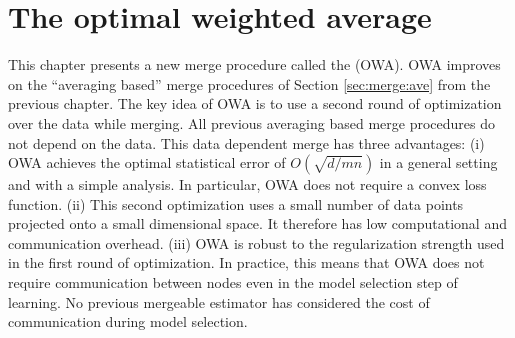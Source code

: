 \documentclass[thesis.tex]{subfiles}
\begin{document}
\chapter{The optimal weighted average}
\label{chapter:owa}

\noindent
This chapter presents a new merge procedure called the  (OWA). 
OWA improves on the ``averaging based'' merge procedures of Section \ref{sec:merge:ave} from the previous chapter.
The key idea of OWA is to use a second round of optimization over the data while merging.
All previous averaging based merge procedures do not depend on the data.
This data dependent merge has three advantages:
(i) OWA achieves the optimal statistical error of $O(\sqrt{d/mn})$ in a general setting and with a simple analysis.
In particular, OWA does not require a convex loss function.
(ii) This second optimization uses a small number of data points projected onto a small dimensional space. 
It therefore has low computational and communication overhead.
(iii) OWA is robust to the regularization strength used in the first round of optimization.
In practice, this means that OWA does not require communication between nodes even in the model selection step of learning.
No previous mergeable estimator has considered the cost of communication during model selection.
\end{document}
